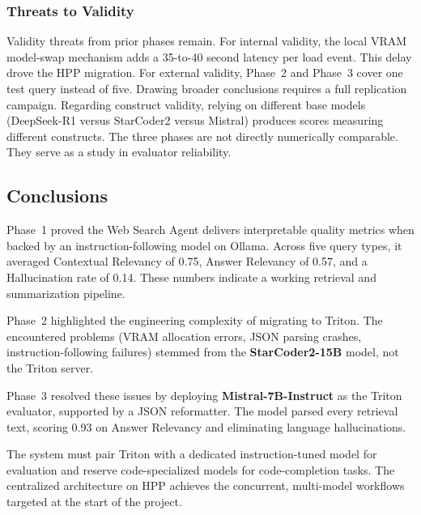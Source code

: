 \subsubsection{Threats to Validity}
Validity threats from prior phases remain. For internal validity, the local VRAM model-swap mechanism adds a 35-to-40 second latency per load event. This delay drove the HPP migration. For external validity, Phase~2 and Phase~3 cover one test query instead of five. Drawing broader conclusions requires a full replication campaign. Regarding construct validity, relying on different base models (DeepSeek-R1 versus StarCoder2 versus Mistral) produces scores measuring different constructs. The three phases are not directly numerically comparable. They serve as a study in evaluator reliability.

\subsection{Conclusions}

Phase~1 proved the Web Search Agent delivers interpretable quality metrics when backed by an instruction-following model on Ollama. Across five query types, it averaged Contextual Relevancy of 0.75, Answer Relevancy of 0.57, and a Hallucination rate of 0.14. These numbers indicate a working retrieval and summarization pipeline.

Phase~2 highlighted the engineering complexity of migrating to Triton. The encountered problems (VRAM allocation errors, JSON parsing crashes, instruction-following failures) stemmed from the \textbf{StarCoder2-15B} model, not the Triton server.

Phase~3 resolved these issues by deploying \textbf{Mistral-7B-Instruct} as the Triton evaluator, supported by a JSON reformatter. The model parsed every retrieval text, scoring 0.93 on Answer Relevancy and eliminating language hallucinations.

The system must pair Triton with a dedicated instruction-tuned model for evaluation and reserve code-specialized models for code-completion tasks. The centralized architecture on HPP achieves the concurrent, multi-model workflows targeted at the start of the project.
